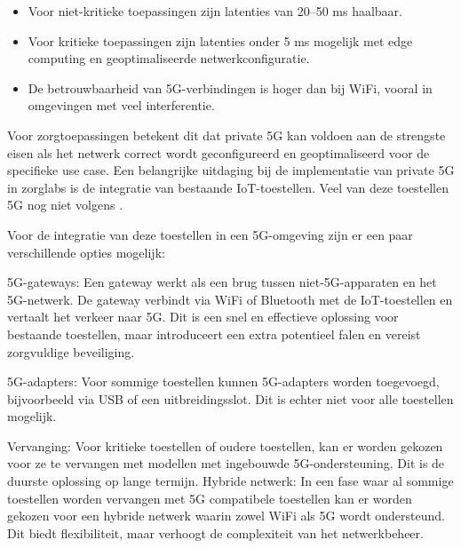 \begin{itemize}
	\item Voor niet-kritieke toepassingen zijn latenties van 20--50 ms haalbaar.
	\item Voor kritieke toepassingen zijn latenties onder 5 ms mogelijk met edge computing en geoptimaliseerde netwerkconfiguratie.
	\item De betrouwbaarheid van 5G-verbindingen is hoger dan bij WiFi, vooral in omgevingen met veel interferentie.
\end{itemize}
\vspace{0.5cm}
Voor zorgtoepassingen betekent dit dat private 5G kan voldoen aan de strengste eisen als het netwerk correct wordt geconfigureerd en geoptimaliseerd voor de specifieke use case.
\vspace{0.5cm}
Een belangrijke uitdaging bij de implementatie van private 5G in zorglabs is de integratie van bestaande IoT-toestellen. Veel van deze toestellen 5G nog niet volgens \autocite{HFCLnzd}.
\vspace{0.5cm}

Voor de integratie van deze toestellen in een 5G-omgeving zijn er een paar verschillende opties mogelijk:
\vspace{0.5cm}

5G-gateways: Een gateway werkt als een brug tussen niet-5G-apparaten en het 5G-netwerk. De gateway verbindt via WiFi of Bluetooth met de IoT-toestellen en vertaalt het verkeer naar 5G. Dit is een snel en effectieve oplossing voor bestaande toestellen, maar introduceert een extra potentieel falen en vereist zorgvuldige beveiliging\autocite{Khanh2022}.
\vspace{0.5cm}

5G-adapters: Voor sommige toestellen kunnen 5G-adapters worden toegevoegd, bijvoorbeeld via USB of een uitbreidingsslot. Dit is echter niet voor alle toestellen mogelijk\autocite{Barros2023}.

\vspace{0.5cm}
Vervanging: Voor kritieke toestellen of oudere toestellen, kan er worden gekozen voor  ze te vervangen met modellen met ingebouwde 5G-ondersteuning. Dit is de duurste oplossing op lange termijn.
\vspace{0.5cm}
Hybride netwerk: In een fase waar al sommige toestellen worden vervangen met 5G compatibele toestellen kan er worden gekozen voor een hybride netwerk waarin zowel WiFi als 5G wordt ondersteund. Dit biedt flexibiliteit, maar verhoogt de complexiteit van het netwerkbeheer\autocite{Frazer2025}.
